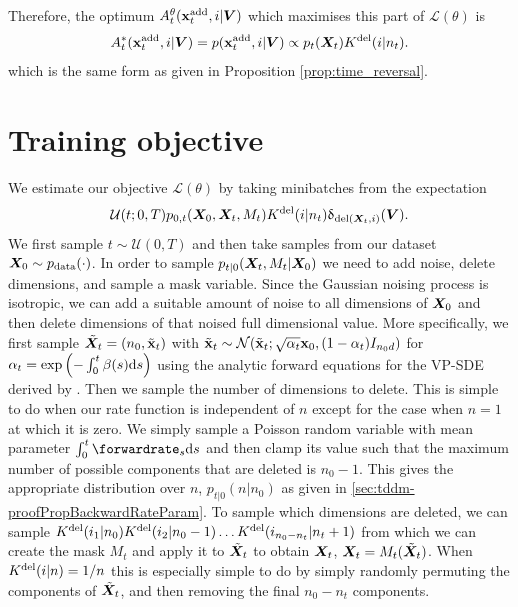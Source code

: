 Therefore, the optimum $A_t^\theta({\mathbf{x}}^{\textup{add}}_t, i | {\bm{V}})$ which maximises this part of $\mathcal{L}(\theta)$ is
\begin{equation}
    A_t^*({\mathbf{x}}^{\textup{add}}_t, i | {\bm{V}}) = p({\mathbf{x}}^{\textup{add}}_t, i | {\bm{V}}) \propto p_t({\bm{X}}_t) K^{\textup{del}}(i | n_t) . 
\end{equation}
which is the same form as given in Proposition \ref{prop:time_reversal}.



\section{Training objective}
\label{sec:tddm-ApdxTrainingObjective}
We estimate our objective $\mathcal{L}(\theta)$ by taking minibatches from the expectation 
\begin{equation}
    \mathcal{U}(t; 0, T) p_{0,t}({\bm{X}}_0, {\bm{X}}_t, M_t) K^{\textup{del}}(i | n_t) \updelta_{\text{del}({\bm{X}}_t, i)}({\bm{V}}).
\end{equation}
We first sample $t \sim \mathcal{U}(0, T)$ and then take samples from our dataset ${\bm{X}}_0 \sim p_{\rm{data}}(\cdot)$. In order to sample $p_{t|0}({\bm{X}}_t, M_t | {\bm{X}}_0)$ we need to add noise, delete dimensions, and sample a mask variable. Since the Gaussian noising process is isotropic, we can add a suitable amount of noise to all dimensions of ${\bm{X}}_0$ and then delete dimensions of that noised full dimensional value. More specifically, we first sample $\tilde{{\bm{X}}}_t = (n_0, \tilde{{\mathbf{x}}}_t)$ with $\tilde{{\mathbf{x}}}_t \sim \mathcal{N}(\tilde{{\mathbf{x}}}_t; \sqrt{\alpha_t} {\mathbf{x}}_0, (1 - \alpha_t) I_{n_0 d})$ for $\alpha_t = \text{exp}\left( - \int_0^t \beta(s) \mathrm{d} s \right)$ using the analytic forward equations for the VP-SDE derived by \citet{song2020score}. Then we sample the number of dimensions to delete. This is simple to do when our rate function is independent of $n$ except for the case when $n=1$ at which it is zero. We simply sample a Poisson random variable with mean parameter $\int_0^t \forwardrate_s \rmd s$ and then clamp its value such that the maximum number of possible components that are deleted is $n_0 - 1$. This gives the appropriate distribution over $n$, $p_{t|0}(n | n_0)$ as given in \cref{sec:tddm-proofPropBackwardRateParam}. To sample which dimensions are deleted, we can sample $K^{\textup{del}}(i_1 | n_0) K^{\textup{del}}(i_2 | n_0-1) \dots K^{\textup{del}}(i_{n_0 - n_t} | n_t+1)$ from which we can create the mask $M_t$ and apply it to $\tilde{{\bm{X}}}_t$ to obtain ${\bm{X}}_t$, ${\bm{X}}_t = M_t(\tilde{{\bm{X}}}_t)$. When $K^{\textup{del}}(i | n) = 1/n$ this is especially simple to do by simply randomly permuting the components of $\tilde{{\bm{X}}}_t$, and then removing the final $n_0 - n_t$ components.\\

